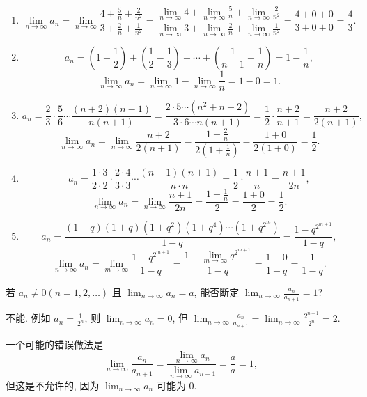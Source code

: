 \begin{solution}
    \begin{enumerate}[(1)]
        \item $$\lim_{n \to \infty} a_n = \lim_{n \to \infty} \frac{4 + \frac{5}{n} + \frac{2}{n^2}}{3 + \frac{2}{n} + \frac{1}{n^2}} = \frac{\displaystyle \lim_{n \to \infty} 4 + \lim_{n \to \infty} \frac{5}{n} + \lim_{n \to \infty} \frac{2}{n^2}}{\displaystyle \lim_{n \to \infty} 3 + \lim_{n \to \infty} \frac{2}{n} + \lim_{n \to \infty} \frac{1}{n^2}} = \frac{4 + 0 + 0}{3 + 0 + 0} = \frac{4}{3}.$$
        \item $$a_n = \left( 1 - \frac{1}{2} \right) + \left( \frac{1}{2} - \frac{1}{3} \right) + \cdots + \left( \frac{1}{n-1} - \frac{1}{n} \right) = 1 - \frac{1}{n},$$
              $$\lim_{n \to \infty} a_n = \lim_{n \to \infty} 1 - \lim_{n \to \infty} \frac{1}{n} = 1 - 0 = 1.$$
        \item $$a_n = \frac{2}{3} \cdot \frac{5}{6} \cdots \frac{(n+2)(n-1)}{n(n+1)} = \frac{2 \cdot 5 \cdots (n^2 + n - 2)}{3 \cdot 6 \cdots n(n+1)} = \frac{1}{2} \cdot \frac{n+2}{n+1} = \frac{n+2}{2(n+1)},$$
              $$\lim_{n \to \infty} a_n = \lim_{n \to \infty} \frac{n+2}{2(n+1)} = \frac{1 + \frac{2}{n}}{2(1 + \frac{1}{n})} = \frac{1 + 0}{2(1 + 0)} = \frac{1}{2}.$$
        \item $$a_n = \frac{1 \cdot 3}{2 \cdot 2} \cdot \frac{2 \cdot 4}{3 \cdot 3} \cdots \frac{(n-1)(n+1)}{n \cdot n} = \frac{1}{2} \cdot \frac{n+1}{n} = \frac{n+1}{2n},$$
              $$\lim_{n \to \infty} a_n = \lim_{n \to \infty} \frac{n+1}{2n} = \frac{1 + \frac{1}{n}}{2} = \frac{1 + 0}{2} = \frac{1}{2}.$$
        \item $$a_n = \frac{(1-q)(1+q)(1+q^2)(1+q^4) \cdots (1+q^{2^m})}{1-q} = \frac{1-q^{2^{m+1}}}{1-q},$$
              $$\lim_{n \to \infty} a_n = \lim_{m \to \infty} \frac{1-q^{2^{m+1}}}{1-q} = \frac{\displaystyle 1 - \lim_{m \to \infty} q^{2^{m+1}}}{1-q} = \frac{1 - 0}{1-q} = \frac{1}{1-q}.$$
    \end{enumerate}
\end{solution}

\begin{exercise}[1.2.9]
    若 $a_n \ne 0 (n=1, 2, \ldots)$ 且 $\lim_{n\to\infty} a_n = a$, 能否断定 $\lim_{n\to\infty} \frac{a_n}{a_{n+1}} = 1$?
\end{exercise}

\begin{solution}
    不能. 例如 $a_n = \frac{1}{2^n}$, 则 $\lim_{n\to\infty} a_n = 0$, 但 $\lim_{n\to\infty} \frac{a_n}{a_{n+1}} = \lim_{n\to\infty} \frac{2^{n+1}}{2^n} = 2$.

    一个可能的错误做法是$$\lim_{n\to\infty} \frac{a_n}{a_{n+1}} = \frac{\lim_{n\to\infty} a_n}{\lim_{n\to\infty} a_{n+1}} = \frac{a}{a} = 1,$$ 但这是不允许的, 因为 $\lim_{n\to\infty} a_n$ 可能为 $0$.
\end{solution}

